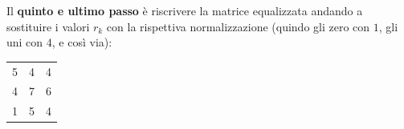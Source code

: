 \documentclass[a4paper]{article}
\begin{document}
	\noindent
	Il \textbf{quinto e ultimo passo} è riscrivere la matrice equalizzata andando a sostituire i valori $r_{k}$ con la rispettiva normalizzazione (quindo gli zero con $1$, gli uni con $4$, e così via):
	\begin{table}[!htbp]
		\centering
		\begin{tabular}{@{} c | c | c @{}}
			\toprule
			5 & 4 & 4 \\
			4 & 7 & 6 \\
			1 & 5 & 4 \\
			\bottomrule
		\end{tabular}
	\end{table}
\end{document}
